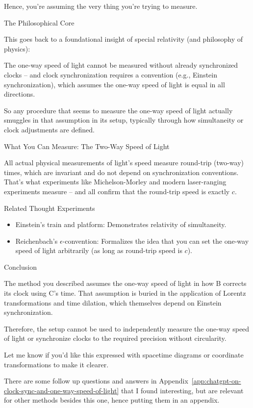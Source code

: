 \documentclass[a4paper]{article}
\theoremstyle{plain}
\theoremstyle{definition}
\begin{document}
Hence, you're assuming the very thing you're trying to measure.

The Philosophical Core

This goes back to a foundational insight of special relativity (and
philosophy of physics):

The one-way speed of light cannot be measured without already
synchronized clocks -- and clock synchronization requires a convention
(e.g., Einstein synchronization), which assumes the one-way speed of
light is equal in all directions.

So any procedure that seems to measure the one-way speed of light
actually smuggles in that assumption in its setup, typically through
how simultaneity or clock adjustments are defined.


What You Can Measure: The Two-Way Speed of Light

All actual physical measurements of light’s speed measure round-trip
(two-way) times, which are invariant and do not depend on
synchronization conventions.  That’s what experiments like
Michelson-Morley and modern laser-ranging experiments measure -- and
all confirm that the round-trip speed is exactly $c$.

Related Thought Experiments

\begin{itemize}
\item Einstein’s train and platform: Demonstrates relativity of
  simultaneity.
\item Reichenbach’s $\epsilon$-convention: Formalizes the idea that
  you can set the one-way speed of light arbitrarily (as long as
  round-trip speed is $c$).
\end{itemize}

Conclusion

The method you described assumes the one-way speed of light in how B
corrects its clock using C’s time.  That assumption is buried in the
application of Lorentz transformations and time dilation, which
themselves depend on Einstein synchronization.

Therefore, the setup cannot be used to independently measure the
one-way speed of light or synchronize clocks to the required precision
without circularity.

Let me know if you'd like this expressed with spacetime diagrams or
coordinate transformations to make it clearer.

There are some follow up questions and answers in
Appendix~\ref{app:chatgpt-on-clock-sync-and-one-way-speed-of-light}
that I found interesting, but are relevant for other methods besides
this one, hence putting them in an appendix.
\end{document}
